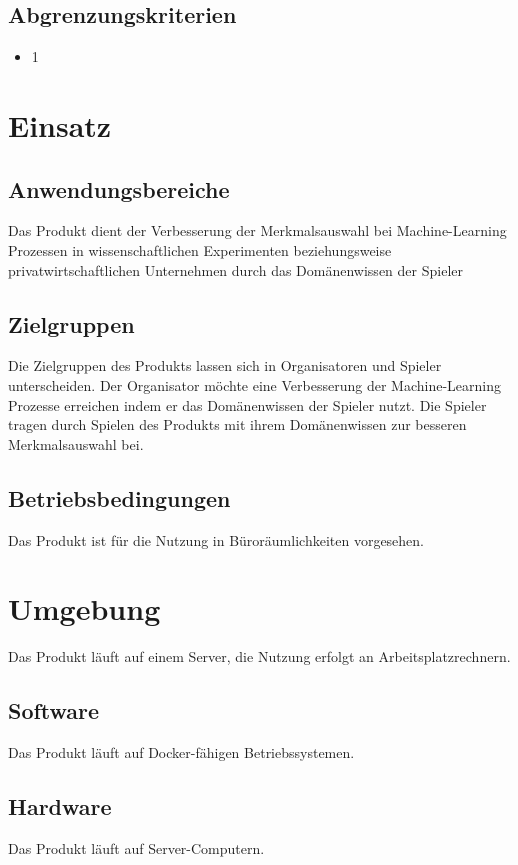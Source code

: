 \documentclass[a4paper]{scrreprt}
\begin{document}
\section{Abgrenzungskriterien}
\begin{itemize} 
\item 1
\end{itemize} 
 
\chapter{Einsatz}

\section{Anwendungsbereiche}
Das \Gls{Produkt} dient der Verbesserung der Merkmalsauswahl bei Machine-Learning Prozessen in wissenschaftlichen
Experimenten beziehungsweise privatwirtschaftlichen Unternehmen durch das Domänenwissen der \Gls{Spieler}

\section{Zielgruppen}
Die Zielgruppen des \Gls{Produkt}s lassen sich in \Gls{Organisator}en und \Gls{Spieler} unterscheiden.
Der Organisator möchte eine Verbesserung der Machine-Learning Prozesse erreichen indem er das Domänenwissen der Spieler nutzt.
Die Spieler tragen durch Spielen des \Gls{Produkt}s mit ihrem Domänenwissen zur besseren Merkmalsauswahl bei.

\section{Betriebsbedingungen}
Das \Gls{Produkt} ist für die Nutzung in Büroräumlichkeiten vorgesehen.

\chapter{Umgebung}
Das \Gls{Produkt} läuft auf einem Server, die Nutzung erfolgt an Arbeitsplatzrechnern.

\section{Software}
Das \Gls{Produkt} läuft auf Docker-fähigen Betriebssystemen.

\section{Hardware}
Das \Gls{Produkt} läuft auf Server-Computern.
\end{document}

